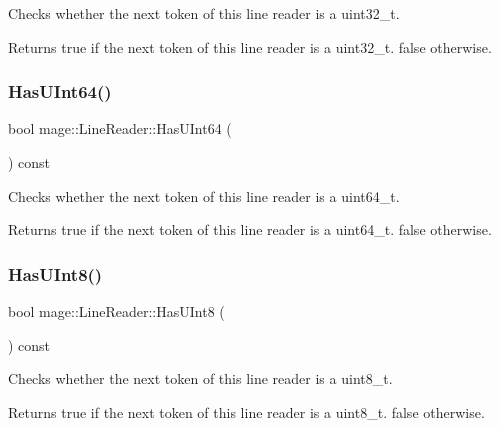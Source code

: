 Checks whether the next token of this line reader is a {\ttfamily uint32\+\_\+t}.

\begin{DoxyReturn}{Returns}
{\ttfamily true} if the next token of this line reader is a {\ttfamily uint32\+\_\+t}. {\ttfamily false} otherwise. 
\end{DoxyReturn}
\hypertarget{classmage_1_1_line_reader_ad311b6edbfc68c01997f90cd1db5d95e}{}\label{classmage_1_1_line_reader_ad311b6edbfc68c01997f90cd1db5d95e} 
\subsubsection{\texorpdfstring{Has\+U\+Int64()}{HasUInt64()}}
{\footnotesize\ttfamily bool mage\+::\+Line\+Reader\+::\+Has\+U\+Int64 (\begin{DoxyParamCaption}{ }\end{DoxyParamCaption}) const\hspace{0.3cm}{\ttfamily [protected]}}

Checks whether the next token of this line reader is a {\ttfamily uint64\+\_\+t}.

\begin{DoxyReturn}{Returns}
{\ttfamily true} if the next token of this line reader is a {\ttfamily uint64\+\_\+t}. {\ttfamily false} otherwise. 
\end{DoxyReturn}
\hypertarget{classmage_1_1_line_reader_a7d9359c8a65005358564728be9091fa8}{}\label{classmage_1_1_line_reader_a7d9359c8a65005358564728be9091fa8} 
\subsubsection{\texorpdfstring{Has\+U\+Int8()}{HasUInt8()}}
{\footnotesize\ttfamily bool mage\+::\+Line\+Reader\+::\+Has\+U\+Int8 (\begin{DoxyParamCaption}{ }\end{DoxyParamCaption}) const\hspace{0.3cm}{\ttfamily [protected]}}

Checks whether the next token of this line reader is a {\ttfamily uint8\+\_\+t}.

\begin{DoxyReturn}{Returns}
{\ttfamily true} if the next token of this line reader is a {\ttfamily uint8\+\_\+t}. {\ttfamily false} otherwise. 
\end{DoxyReturn}
\hypertarget{classmage_1_1_line_reader_a2247078d0b5602f9a9a6b74019832faf}{}\label{classmage_1_1_line_reader_a2247078d0b5602f9a9a6b74019832faf} 
